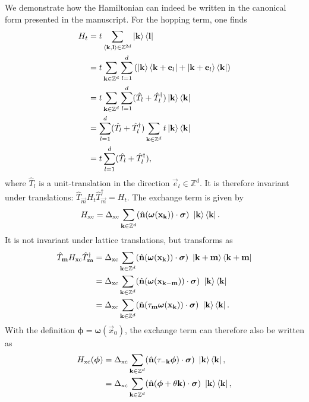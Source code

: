 \documentclass[
    10pt,
    aps,
    prb,
    twocolumn,
    floatfix,
    superscriptaddress,
]{revtex4-2}
\begin{document}
We demonstrate how the Hamiltonian can indeed be written in the canonical form presented in the manuscript.
For the hopping term, one finds
\begin{align}
H_t &= t \sum_{\braket{\mathbf{k},\mathbf{l}} \in \mathbb{Z}^{2d}}\ket{\mathbf{k}}\bra{\mathbf{l}}
\notag \\
&= 
	t \sum_{\mathbf{k} \in \mathbb{Z}^{d}}  \sum_{l=1}^d
	\left( \ket{\mathbf{k}}\bra{\mathbf{k}+\mathbf{e}_l } + \ket{\mathbf{k}+\mathbf{e}_l}\bra{\mathbf{k} } \right)
\notag \\
&= 
	t \sum_{\mathbf{k} \in \mathbb{Z}^{d}} \sum_{l=1}^d
	(\hat{T}_l + \hat{T}_l^\dagger)\ket{\mathbf{k}}\bra{\mathbf{k} } 
\notag \\
&= 
 \sum_{l=1}^d
(\hat{T}_l+ \hat{T}_l^\dagger) \sum_{\mathbf{k} \in \mathbb{Z}^{d}} t \ket{\mathbf{k}}\bra{\mathbf{k} } 
\notag \\
&= t
\sum_{l=1}^d
(\hat{T}_l + \hat{T}_l^\dagger)  ,
\end{align}
where $\hat{T}_l$ is a unit-translation in the direction $\vec{e}_l \in \mathbb{Z}^d$.
It is therefore invariant under translations:  $\hat{T}_\vec{m} 
H_t
\hat{T}_\vec{m}^\dagger = H_t$. 
The exchange term is given by
\begin{align}
	H_\mathrm{xc} &=
	\Delta_\mathrm{xc}\sum_{\mathbf{k} \in \mathbb{Z}^d}  (\hat{\mathbf{n}} (\boldsymbol{\omega}(\mathbf{x}_{\mathbf{k}})) \cdot \boldsymbol{\sigma}) ~ \ket{\mathbf{k}}\bra{\mathbf{k}} .
\end{align}
It is not invariant under lattice translations, but transforms as
\begin{align}
	\hat{T}_{\mathbf{m}}
	H_\mathrm{xc}
	\hat{T}_{\mathbf{m}}^\dagger
	& = \Delta_\mathrm{xc}\sum_{\mathbf{k} \in \mathbb{Z}^d}  (\hat{\mathbf{n}} (\boldsymbol{\omega}(\mathbf{x}_{\mathbf{k}})) \cdot \boldsymbol{\sigma}) ~ \ket{\mathbf{k}+\mathbf{m}}\bra{\mathbf{k}+\mathbf{m}}
		\notag \\
	& = \Delta_\mathrm{xc}\sum_{\mathbf{k} \in \mathbb{Z}^d}  (\hat{\mathbf{n}} (\boldsymbol{\omega}(\mathbf{x}_{\mathbf{k}-\mathbf{m}})) \cdot \boldsymbol{\sigma}) ~ \ket{\mathbf{k}}\bra{\mathbf{k}}
	\notag \\
	& = \Delta_\mathrm{xc}\sum_{\mathbf{k} \in \mathbb{Z}^d}  (\hat{\mathbf{n}} (\tau_{\mathbf{m}} \boldsymbol{\omega}(\mathbf{x}_{\mathbf{k}})) \cdot \boldsymbol{\sigma}) ~ \ket{\mathbf{k}}\bra{\mathbf{k}} . 
\end{align} 
With the definition $\boldsymbol{\phi} = \boldsymbol{\omega}(\vec{x}_0)$, the exchange term can therefore also be written as 
\begin{align}
	H_\mathrm{xc}( \boldsymbol{\phi} ) &=
	\Delta_\mathrm{xc}\sum_{\mathbf{k} \in \mathbb{Z}^d}  (\hat{\mathbf{n}} ( \tau_{\mathbf{-k}}\boldsymbol{\phi}) \cdot \boldsymbol{\sigma}) ~ \ket{\mathbf{k}}\bra{\mathbf{k}} ,
	\notag \\ & =
	\Delta_\mathrm{xc}\sum_{\mathbf{k} \in \mathbb{Z}^d}  (\hat{\mathbf{n}} (\boldsymbol{\phi} + \theta \mathbf{k}) \cdot \boldsymbol{\sigma}) ~ \ket{\mathbf{k}}\bra{\mathbf{k}},
\end{align}
\end{document}
